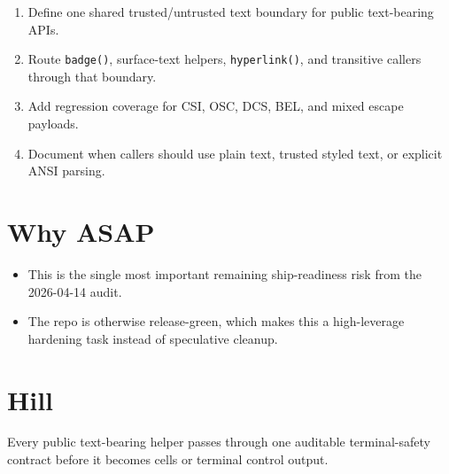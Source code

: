 \begin{enumerate}
\def\labelenumi{\arabic{enumi}.}
\tightlist
\item
  Define one shared trusted/untrusted text boundary for public text-bearing APIs.
\item
  Route \texttt{b\allowbreak{}a\allowbreak{}d\allowbreak{}g\allowbreak{}e\allowbreak{}(\allowbreak{})}, surface-text helpers, \texttt{h\allowbreak{}y\allowbreak{}p\allowbreak{}e\allowbreak{}r\allowbreak{}l\allowbreak{}i\allowbreak{}n\allowbreak{}k\allowbreak{}(\allowbreak{})}, and transitive callers through that boundary.
\item
  Add regression coverage for CSI, OSC, DCS, BEL, and mixed escape payloads.
\item
  Document when callers should use plain text, trusted styled text, or explicit ANSI parsing.
\end{enumerate}

\section{Why ASAP}\label{record-258-why-asap}

\begin{itemize}
\tightlist
\item
  This is the single most important remaining ship-readiness risk from the 2026-04-14 audit.
\item
  The repo is otherwise release-green, which makes this a high-leverage hardening task instead of speculative cleanup.
\end{itemize}

\section{Hill}\label{record-258-hill-1}

Every public text-bearing helper passes through one auditable terminal-safety contract before it becomes cells or terminal control output.

